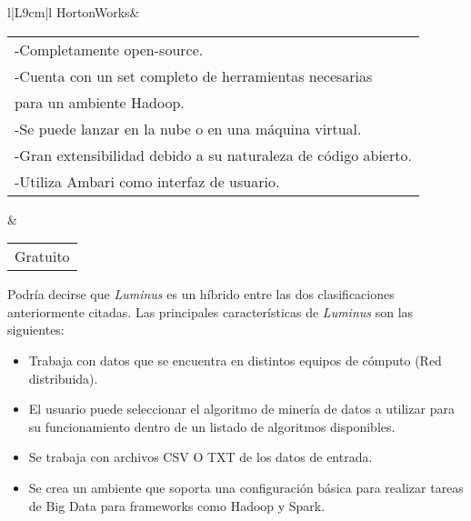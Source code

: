 \begin{itemize}
\begin{table}[H]
\begin{tabular}{l|L{9cm}|l}
		\hline
			HortonWorks& \begin{tabular}[c]{@{}l@{}}-Completamente open-source.\\ -Cuenta con un set completo de herramientas necesarias \\para un ambiente Hadoop.\\ -Se puede lanzar en la nube o en una máquina virtual.\\ -Gran extensibilidad debido a su naturaleza de código abierto.\\ -Utiliza Ambari como interfaz de usuario. \cite{infoHortonworks}\\ \end{tabular} & \begin{tabular}[c]{@{}l@{}} Gratuito \cite{precioHortonworks}\\ \end{tabular}

		\end{tabular}
	\end{table}
\end{itemize}

Podría decirse que \emph{Luminus} es un híbrido entre las dos clasificaciones anteriormente citadas. Las principales características de \emph{Luminus} son las siguientes:
\begin{itemize}	
	\item Trabaja con datos que se encuentra en distintos equipos de cómputo (Red distribuida).\\ 
	\item El usuario puede seleccionar el algoritmo de minería de datos a utilizar para su funcionamiento dentro de un listado de algoritmos disponibles.\\ 
	\item Se trabaja con archivos CSV O TXT de los datos de entrada.\\
	\item Se crea un ambiente que soporta una configuración básica para realizar tareas de Big Data para frameworks como Hadoop y Spark.\\
\end{itemize}
